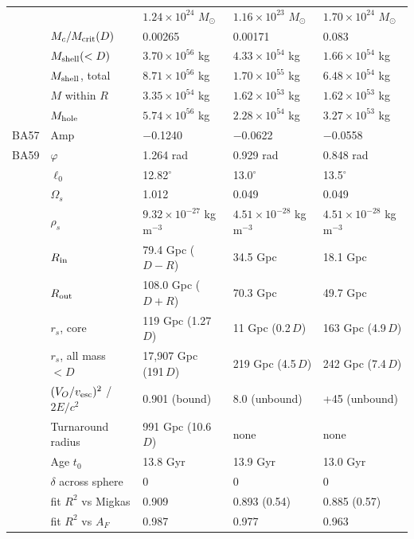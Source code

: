\documentclass[10pt,letterpaper]{article}
\begin{document}
\begin{minipage}[t]{0.59\textwidth}
\begin{tabular}{lllll}
 &  & $1.24\times10^{24}$ $M_\odot$ & $1.16\times10^{23}$ $M_\odot$ & $1.70\times10^{24}$ $M_\odot$\\
 & $M_c/M_{\rm crit}(D)$ & 0.00265 & 0.00171 & 0.083\\
 & $M_{\rm shell}(<D)$ & $3.70\times10^{56}$ kg & $4.33\times10^{54}$ kg & $1.66\times10^{54}$ kg\\
 & $M_{\rm shell}$, total & $8.71\times10^{56}$ kg & $1.70\times10^{55}$ kg & $6.48\times10^{54}$ kg\\
 & $M$ within $R$ & $3.35\times10^{54}$ kg & $1.62\times10^{53}$ kg & $1.62\times10^{53}$ kg\\
 & $M_{\rm hole}$ & $5.74\times10^{56}$ kg & $2.28\times10^{54}$ kg & $3.27\times10^{53}$ kg\\
BA57 & Amp & $-$0.1240 & $-$0.0622 & $-$0.0558\\
BA59 & $\varphi$ & 1.264 rad & 0.929 rad & 0.848 rad\\
 & $\ell_0$ & 12.82$^\circ$ & 13.0$^\circ$ & 13.5$^\circ$\\
\midrule
 & $\Omega_s$ & 1.012 & 0.049 & 0.049\\
 & $\rho_s$ & $9.32\times10^{-27}$ kg\,m$^{-3}$ & $4.51\times10^{-28}$ kg\,m$^{-3}$ & $4.51\times10^{-28}$ kg\,m$^{-3}$\\
 & $R_{\rm in}$ & 79.4 Gpc ($D-R$) & 34.5 Gpc & 18.1 Gpc\\
 & $R_{\rm out}$ & 108.0 Gpc ($D+R$) & 70.3 Gpc & 49.7 Gpc\\
 & $r_s$, core & 119 Gpc (1.27\,$D$) & 11 Gpc (0.2\,$D$) & 163 Gpc (4.9\,$D$)\\
 & $r_s$, all mass $<D$ & 17{,}907 Gpc (191\,$D$) & 219 Gpc (4.5\,$D$) & 242 Gpc (7.4\,$D$)\\
\midrule
 & $(V_O/v_{\rm esc})^2$ / $2E/c^2$ & 0.901 (bound) & 8.0 (unbound) & +45 (unbound)\\
 & Turnaround radius & 991 Gpc (10.6\,$D$) & none & none\\
 & Age $t_0$ & 13.8 Gyr & 13.9 Gyr & 13.0 Gyr\\
 & $\delta$ across sphere & 0 & 0 & 0\\
 & fit $R^2$ vs Migkas & 0.909 & 0.893 (0.54) & 0.885 (0.57)\\
 & fit $R^2$ vs $A_F$ & 0.987 & 0.977 & 0.963\\
\bottomrule
\end{tabular}
\end{minipage}
\par\vspace{6pt}
\end{document}
